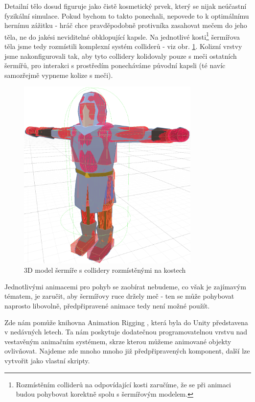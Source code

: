 Detailní tělo dosud figuruje jako čistě kosmetický prvek, který se nijak neúčastní fyzikální simulace. Pokud bychom to takto ponechali, nepovede to k optimálnímu hernímu zážitku - hráč chce pravděpodobně protivníka zasahovat mečem do jeho těla, ne do jakési neviditelné obklopující kapsle. Na jednotlivé kosti\footnote{Rozmístěním colliderů na odpovídající kosti zaručíme, že se při animaci budou pohybovat korektně spolu s šermířovým modelem.} šermířova těla jsme tedy rozmístili komplexní systém colliderů - viz obr. \ref{obr05:swordsmanDetailedColliders}. Kolizní vrstvy jsme nakonfigurovali tak, aby tyto collidery kolidovaly pouze s meči ostatních šermířů, pro interakci s prostředím ponecháváme původní kapsli (té navíc samozřejmě vypneme kolize s meči). 

\begin{figure}[ht]\centering
  \center
  \includegraphics[width=90mm]{../img/swordsmanBodyColliders.png}
  \caption{3D model šermíře s collidery rozmístěnými na kostech}
  \label{obr05:swordsmanDetailedColliders}
\end{figure} 

Jednotlivými animacemi pro pohyb se zaobírat nebudeme, co však je zajímavým tématem, je zaručit, aby šermířovy ruce držely meč - ten se může pohybovat naprosto libovolně, předpřipravené animace tedy není možné použít. 

Zde nám pomůže knihovna Animation Rigging \cite{AnimationRigging}, která byla do Unity představena v nedávných letech. Ta nám poskytuje dodatečnou programovatelnou vrstvu nad vestavěným animačním systémem, skrze kterou můžeme animované objekty ovlivňovat. Najdeme zde mnoho mnoho již předpřipravených komponent, další lze vytvořit jako vlastní skripty.

